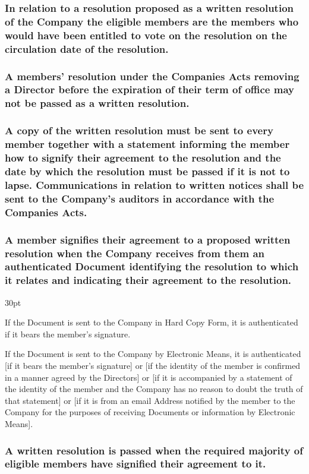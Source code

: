 \documentclass[12pt]{article}
\def\clauseindent{30pt}
\newenvironment{subindentpara}{\begin{adjustwidth}{\clauseindent}{}\begin{hanginglist}}{\end{hanginglist}\end{adjustwidth}}
\begin{document}
\subsubsection{In relation to a resolution proposed as a written resolution of the Company the eligible members are the members who would have been entitled to vote on the resolution on the circulation date of the resolution.}
\subsubsection{\label{subsubsection:WrittenResolutionException}A members’ resolution under the Companies Acts removing a Director before the expiration of their term of office may not be passed as a written resolution.}
\subsubsection{A copy of the written resolution must be sent to every member together with a statement informing the member how to signify their agreement to the resolution and the date by which the resolution must be passed if it is not to lapse. Communications in relation to written notices shall be sent to the Company’s auditors in accordance with the Companies Acts.}
\subsubsection{A member signifies their agreement to a proposed written resolution when the Company receives from them an authenticated Document identifying the resolution to which it relates and indicating their agreement to the resolution.}
\begin{subindentpara}
    \item If the Document is sent to the Company in Hard Copy Form, it is authenticated if it bears the member’s signature.
    \item If the Document is sent to the Company by Electronic Means, it is authenticated [if it bears the member’s signature] or [if the identity of the member is confirmed in a manner agreed by the Directors] or [if it is accompanied by a statement of the identity of the member and the Company has no reason to doubt the truth of that statement] or [if it is from an email Address notified by the member to the Company for the purposes of receiving Documents or information by Electronic Means].
\end{subindentpara}
\subsubsection{A written resolution is passed when the required majority of eligible members have signified their agreement to it.}
\end{document}
